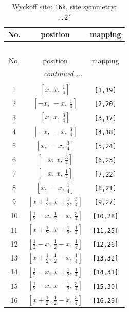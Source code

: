 \documentclass[fleqn,8pt]{jsarticle}
\begin{document}
\renewcommand{\arraystretch}{1.2}
\begin{longtable}{ccc}
\caption{Wyckoff site: {\tt 16k}, site symmetry: {\tt ..2'}}
 \\
 \hline \hline
No. & position & mapping \\ \hline \endfirsthead

\multicolumn{2}{l}{\tablename\ \thetable{}} \\
 \hline \hline
No. & position & mapping \\ \hline \endhead

 \hline \hline
\multicolumn{2}{r}{\footnotesize\it continued ...} \\ \endfoot

 \hline \hline
\multicolumn{2}{r}{} \\ \endlastfoot

1 & $\left[ x,\, x,\, \frac{1}{4} \right]$ & {\tt [1,19]} \\ \hline
2 & $\left[ - x,\, - x,\, \frac{1}{4} \right]$ & {\tt [2,20]} \\ \hline
3 & $\left[ x,\, x,\, \frac{3}{4} \right]$ & {\tt [3,17]} \\ \hline
4 & $\left[ - x,\, - x,\, \frac{3}{4} \right]$ & {\tt [4,18]} \\ \hline
5 & $\left[ x,\, - x,\, \frac{3}{4} \right]$ & {\tt [5,24]} \\ \hline
6 & $\left[ - x,\, x,\, \frac{3}{4} \right]$ & {\tt [6,23]} \\ \hline
7 & $\left[ - x,\, x,\, \frac{1}{4} \right]$ & {\tt [7,22]} \\ \hline
8 & $\left[ x,\, - x,\, \frac{1}{4} \right]$ & {\tt [8,21]} \\ \hline
9 & $\left[ x + \frac{1}{2},\, x + \frac{1}{2},\, \frac{3}{4} \right]$ & {\tt [9,27]} \\ \hline
10 & $\left[ \frac{1}{2} - x,\, \frac{1}{2} - x,\, \frac{3}{4} \right]$ & {\tt [10,28]} \\ \hline
11 & $\left[ x + \frac{1}{2},\, x + \frac{1}{2},\, \frac{1}{4} \right]$ & {\tt [11,25]} \\ \hline
12 & $\left[ \frac{1}{2} - x,\, \frac{1}{2} - x,\, \frac{1}{4} \right]$ & {\tt [12,26]} \\ \hline
13 & $\left[ x + \frac{1}{2},\, \frac{1}{2} - x,\, \frac{1}{4} \right]$ & {\tt [13,32]} \\ \hline
14 & $\left[ \frac{1}{2} - x,\, x + \frac{1}{2},\, \frac{1}{4} \right]$ & {\tt [14,31]} \\ \hline
15 & $\left[ \frac{1}{2} - x,\, x + \frac{1}{2},\, \frac{3}{4} \right]$ & {\tt [15,30]} \\ \hline
16 & $\left[ x + \frac{1}{2},\, \frac{1}{2} - x,\, \frac{3}{4} \right]$ & {\tt [16,29]} \\
\end{longtable}
\end{document}
